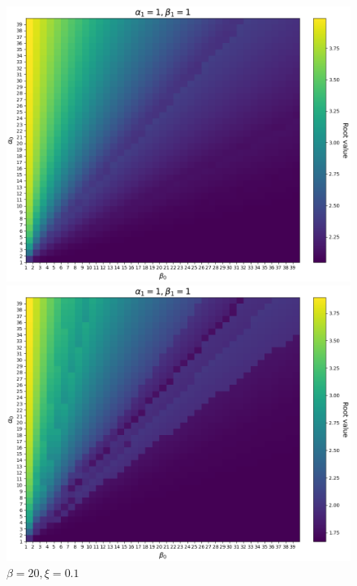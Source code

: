 \documentclass{article}
\begin{document}
\begin{figure}[ht!]
    \begin{minipage}{0.49\textwidth}
        \centering
        \includegraphics[width=1\textwidth]{../../../../bandit/data/convergence/num_replays/temp20/value_horizon4_alpha1_beta1_xi0001_temp20.png}
        \caption{$\beta=20, \xi=0.001$}
    \end{minipage}%
    \begin{minipage}{0.49\textwidth}
        \centering
        \includegraphics[width=1\textwidth]{../../../../bandit/data/convergence/num_replays/temp20/value_horizon4_alpha1_beta1_xi01_temp20.png}
        \caption{$\beta=20, \xi=0.1$}
    \end{minipage}
\end{figure}
\end{document}
